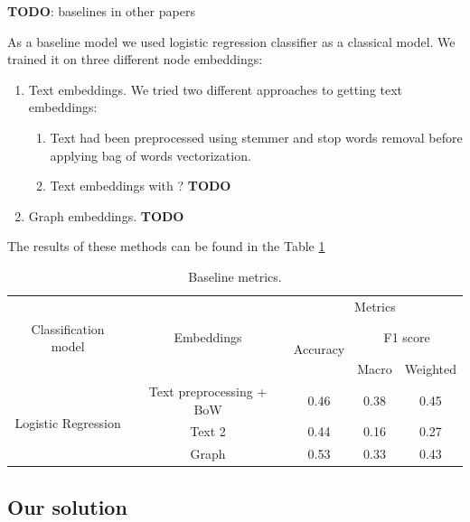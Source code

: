 \documentclass{article}
\begin{document}
\textbf{TODO}: baselines in other papers

As a baseline model we used logistic regression classifier as a classical model. We trained it on three different node embeddings:
\begin{enumerate}

\item[1.] Text embeddings. \newline
We tried two different approaches to getting text embeddings:
\begin{enumerate}
\item[a)] Text had been preprocessed using stemmer and stop words removal before applying bag of words vectorization.
\item[b)] Text embeddings with ? \textbf{TODO}
\end{enumerate}

\item[2.] Graph embeddings.\newline
\textbf{TODO}
\end{enumerate}

The results of these methods can be found in the Table \ref{table:baseline_metrics}

\begin{table}[h]
\centering
\begin{tabular}{c c  c c c}
\hline\hline
 & & \multicolumn{3}{c}{Metrics} \\
\cline{3-5}
Classification model & Embeddings & \multirow{2}{*}{Accuracy} & \multicolumn{2}{c}{F1 score} \\
 & & & Macro & Weighted \\
\hline
\multirow{3}{*}{Logistic Regression} & Text preprocessing + BoW & 0.46 & 0.38 & 0.45 \\
 & Text 2 & 0.44 & 0.16 & 0.27 \\
 & Graph & 0.53 & 0.33 & 0.43 \\
\hline
\end{tabular}
\caption{Baseline metrics.}
\label{table:baseline_metrics}
\end{table}

\subsection{Our solution}
\end{document}
